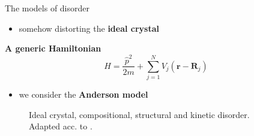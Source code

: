 \documentclass[1pt]{beamer}
\begin{document}
\begin{frame}{The models of disorder}
\begin{minipage}[c]{0.57\textwidth}
\begin{itemize}
\item somehow distorting the \textbf{ideal crystal}\vspace{8mm}  
\end{itemize}
\begin{alertblock}{\centering\textbf{A generic Hamiltonian}}
$$
H=\frac{\hat{p}^2}{2m} + \sum\limits_{j=1}^N V_j(\mathbf{r}-\mathbf{R}_j)
$$
\end{alertblock}\vspace{10mm}
\begin{itemize}
\item we consider the \textbf{Anderson model}
\end{itemize}
\end{minipage}\hfill
\begin{minipage}[c]{0.4\textwidth}
\begin{figure}
\caption{Ideal crystal, compositional, structural and kinetic disorder. Adapted acc. to \cite{Kramer}.}
\end{figure}
\end{minipage}
\end{frame}
\end{document}

